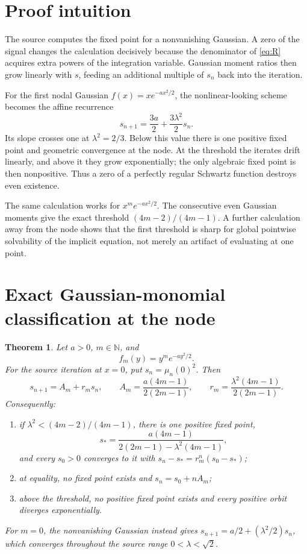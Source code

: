 \documentclass[11pt]{article}
\newtheorem{theorem}{Theorem}
\theoremstyle{remark}
\begin{document}
\section{Proof intuition}

The source computes the fixed point for a nonvanishing Gaussian.  A zero of the
signal changes the calculation decisively because the denominator of
\eqref{eq:R} acquires extra powers of the integration variable.  Gaussian
moment ratios then grow linearly with $s$, feeding an additional multiple of
$s_n$ back into the iteration.

For the first nodal Gaussian $f(x)=x e^{-a x^2/2}$, the nonlinear-looking
scheme becomes the affine recurrence
\[
 s_{n+1}=\frac{3a}{2}+\frac{3\lambda^2}{2}s_n.
\]
Its slope crosses one at $\lambda^2=2/3$.  Below this value there is one
positive fixed point and geometric convergence at the node.  At the threshold
the iterates drift linearly, and above it they grow exponentially; the only
algebraic fixed point is then nonpositive.  Thus a zero of a perfectly regular
Schwartz function destroys even existence.

The same calculation works for $x^m e^{-a x^2/2}$.  The consecutive even
Gaussian moments give the exact threshold
$(4m-2)/(4m-1)$.  A further calculation away from the node shows that the first
threshold is sharp for global pointwise solvability of the implicit equation,
not merely an artifact of evaluating at one point.

\section{Exact Gaussian-monomial classification at the node}

\begin{theorem}\label{thm:family}
Let $a>0$, $m\in\mathbb N$, and
\[
 f_m(y)=y^m e^{-a y^2/2}.
\]
For the source iteration at $x=0$, put $s_n=\mu_n(0)^2$.  Then
\begin{equation}\label{eq:affine}
 s_{n+1}=A_m+r_m s_n,
 \qquad
 A_m=\frac{a(4m-1)}{2(2m-1)},
 \qquad
 r_m=\frac{\lambda^2(4m-1)}{2(2m-1)}.
\end{equation}
Consequently:
\begin{enumerate}[label=(\roman*)]
\item if $\lambda^2<(4m-2)/(4m-1)$, there is one positive fixed point,
\[
 s_* =\frac{a(4m-1)}{2(2m-1)-\lambda^2(4m-1)},
\]
and every $s_0>0$ converges to it with
$s_n-s_*=r_m^n(s_0-s_*)$;
\item at equality, no fixed point exists and $s_n=s_0+nA_m$;
\item above the threshold, no positive fixed point exists and every positive
orbit diverges exponentially.
\end{enumerate}
For $m=0$, the nonvanishing Gaussian instead gives
$s_{n+1}=a/2+(\lambda^2/2)s_n$, which converges throughout the source range
$0<\lambda<\sqrt2$.
\end{theorem}
\end{document}
